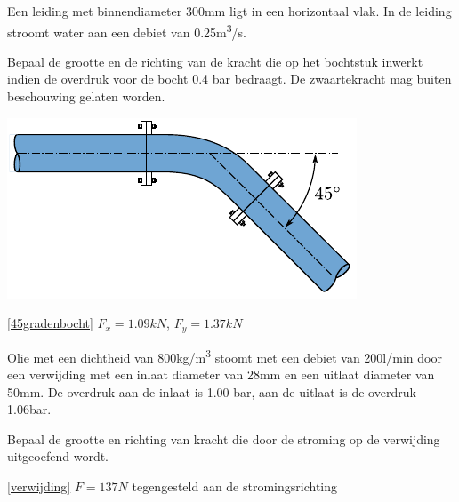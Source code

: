 \begin{toepassing}[*]
	\label{45gradenbocht}
Een leiding met binnendiameter 300mm ligt in een horizontaal vlak. In de leiding stroomt water aan een debiet van 0.25\unit{m^3/s}.    

Bepaal de grootte en de richting van de kracht die op het bochtstuk inwerkt indien de overdruk voor de bocht 0.4 bar bedraagt. De zwaartekracht mag buiten beschouwing gelaten worden.

	\centering
	\includegraphics{fig/behoudsvergelijkingen/45gradenbocht}
\end{toepassing}
\begin{antwoord}{\ref{45gradenbocht}}
	$F_x = 1.09\unit{kN}$, $F_y = 1.37\unit{kN}$
\end{antwoord}
\begin{toepassing}[*]
	\label{verwijding}
Olie met een dichtheid van 800\unit{kg/m^3} stoomt met een debiet van 200l/min door een verwijding met een inlaat diameter van 28mm en een uitlaat diameter van 50mm. De overdruk aan de inlaat is 1.00 bar, aan de uitlaat is de overdruk 1.06bar.

Bepaal de grootte en richting van kracht die door de stroming op de verwijding uitgeoefend wordt.
\end{toepassing}
\begin{antwoord}{\ref{verwijding}}
	$F = 137\unit{N}$ tegengesteld aan de stromingsrichting
\end{antwoord}

